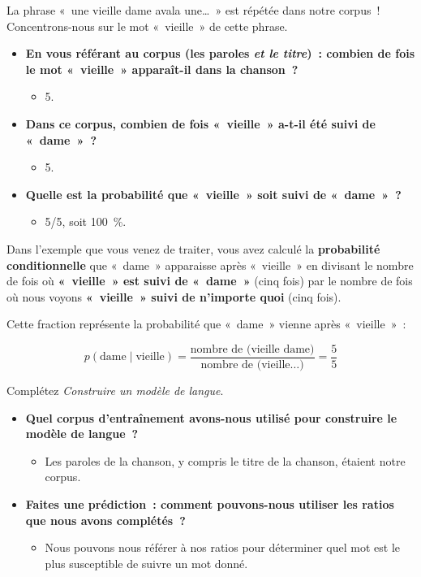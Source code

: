 \documentclass[12pt,a4paper]{article}
\begin{document}
La phrase «~une vieille dame avala une…~» est répétée dans notre corpus~! Concentrons-nous sur le mot «~vieille~» de cette phrase.

\begin{thinkbox}
  \begin{itemize}
    \item \textbf{En vous référant au corpus (les paroles \emph{et le titre})~: combien de fois le mot «~vieille~» apparaît-il dans la chanson~?}
    \begin{itemize}
      \item 5.
    \end{itemize}
    \item \textbf{Dans ce corpus, combien de fois «~vieille~» a-t-il été suivi de «~dame~»~?}
    \begin{itemize}
      \item 5.
    \end{itemize}
    \item \textbf{Quelle est la probabilité que «~vieille~» soit suivi de «~dame~»~?}
    \begin{itemize}
      \item 5/5, soit 100~\%.
    \end{itemize}
  \end{itemize}
\end{thinkbox}

Dans l'exemple que vous venez de traiter, vous avez calculé la \textbf{probabilité conditionnelle} que «~dame~» apparaisse après «~vieille~» en divisant le nombre de fois où \textbf{«~vieille~» est suivi de «~dame~»} (cinq fois) par le nombre de fois où nous voyons \textbf{«~vieille~» suivi de n'importe quoi} (cinq fois).

Cette fraction représente la probabilité que «~dame~» vienne après «~vieille~»~:

\[
p(\text{dame} \mid \text{vieille}) = \frac{\text{nombre de (vieille dame)}}{\text{nombre de (vieille…)}} = \frac{5}{5}
\]

\begin{activitybox}
  Complétez \emph{Construire un modèle de langue}.

  \begin{itemize}
    \item \textbf{Quel corpus d'entraînement avons-nous utilisé pour construire le modèle de langue~?}
    \begin{itemize}
      \item Les paroles de la chanson, y compris le titre de la chanson, étaient notre corpus.
    \end{itemize}
    \item \textbf{Faites une prédiction~: comment pouvons-nous utiliser les ratios que nous avons complétés~?}
    \begin{itemize}
      \item Nous pouvons nous référer à nos ratios pour déterminer quel mot est le plus susceptible de suivre un mot donné.
    \end{itemize}
  \end{itemize}
\end{activitybox}
\end{document}
